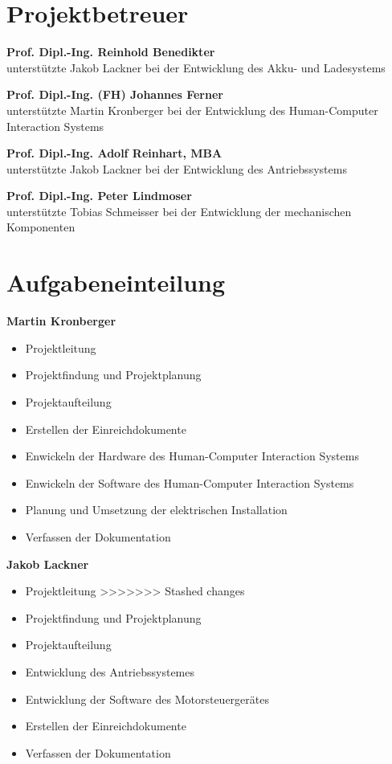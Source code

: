 \section{Projektbetreuer}

\textbf{Prof. Dipl.-Ing. Reinhold Benedikter}\\
unterstützte Jakob Lackner bei der Entwicklung des Akku- und Ladesystems
\bigskip

\textbf{Prof. Dipl.-Ing. (FH) Johannes Ferner}\\
unterstützte Martin Kronberger bei der Entwicklung des Human-Computer Interaction Systems
\bigskip

\textbf{Prof. Dipl.-Ing. Adolf Reinhart, MBA}\\
unterstützte Jakob Lackner bei der Entwicklung des Antriebssystems
\bigskip

\textbf{Prof. Dipl.-Ing. Peter Lindmoser}\\
unterstützte Tobias Schmeisser bei der Entwicklung der mechanischen Komponenten

\section{Aufgabeneinteilung}

\textbf{Martin Kronberger}
\begin{itemize}
	\item Projektleitung
	\item Projektfindung und Projektplanung
	\item Projektaufteilung
	\item Erstellen der Einreichdokumente
	\item Enwickeln der Hardware des Human-Computer Interaction Systems
	\item Enwickeln der Software des Human-Computer Interaction Systems
	\item Planung und Umsetzung der elektrischen Installation	
	\item Verfassen der Dokumentation
\end{itemize}
\bigskip

\textbf{Jakob Lackner}
\begin{itemize}
<<<<<<< Updated upstream
=======
	\item Projektleitung
>>>>>>> Stashed changes
	\item Projektfindung und Projektplanung
	\item Projektaufteilung
	\item Entwicklung des Antriebssystemes
	\item Entwicklung der Software des Motorsteuergerätes
	\item Erstellen der Einreichdokumente
	\item Verfassen der Dokumentation
\end{itemize}

